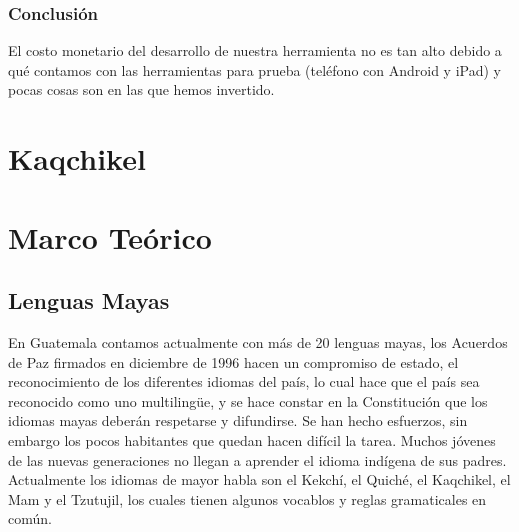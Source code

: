\documentclass[a4paper,openright,11pt]{article}
\begin{document}
\begin{table}[h]
\caption{Factibilidad Econ\'omica}
\end{table}

\subsubsection{Conclusión}
El costo monetario del desarrollo de nuestra herramienta no es tan alto debido a qué contamos con las herramientas para prueba (teléfono con Android y iPad) y pocas cosas son en las que hemos invertido.
\newpage

\section{Kaqchikel}
\newpage

\section{Marco Teórico}
\subsection{Lenguas Mayas}
En Guatemala contamos actualmente con más de 20 lenguas mayas,  los Acuerdos de Paz firmados en diciembre de 1996 hacen un compromiso de estado, el reconocimiento de los diferentes idiomas del país, lo cual hace que el país sea reconocido como uno multilingüe, y se hace constar en la Constitución que los idiomas mayas deberán respetarse y difundirse. Se han hecho esfuerzos, sin embargo los pocos habitantes que quedan hacen difícil la tarea. Muchos jóvenes de las nuevas generaciones no llegan a aprender el idioma indígena de sus padres. Actualmente los idiomas de mayor habla son el Kekchí, el Quiché, el Kaqchikel, el Mam y el Tzutujil, los cuales tienen algunos vocablos y reglas gramaticales en común. \\
 
\end{document}
